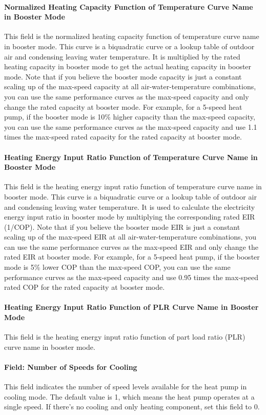 \paragraph{Normalized Heating Capacity Function of Temperature Curve Name in
Booster Mode} This field is the normalized heating capacity function of
temperature curve name in booster mode. This curve is a biquadratic curve or a
lookup table of outdoor air and condensing leaving water temperature. It is
multiplied by the rated heating capacity in booster mode to get the actual
heating capacity in booster mode. Note that if you believe the booster mode
capacity is just a constant scaling up of the max-speed capacity at all
air-water-temperature combinations, you can use the same performance curves as
the max-speed capacity and only change the rated capacity at booster mode.
For example, for a 5-speed heat pump, if the booster mode is 10\% higher capacity
than the max-speed capacity, you can use the same performance curves as the max-speed
capacity and use 1.1 times the max-speed rated capacity for the rated capacity at booster mode.
\paragraph{Heating Energy Input Ratio Function of Temperature Curve Name in
Booster Mode} This field is the heating energy input ratio function of
temperature curve name in booster mode. This curve is a biquadratic curve or a
lookup table of outdoor air and condensing leaving water temperature. It is used
to calculate the electricity energy input ratio in booster mode by multiplying
the corresponding rated EIR (1/COP). Note that if you believe the booster mode
EIR is just a constant scaling up of the max-speed EIR at all
air-water-temperature combinations, you can use the same performance curves as
the max-speed EIR and only change the rated EIR at booster mode.
For example, for a 5-speed heat pump, if the booster mode is 5\% lower COP
than the max-speed COP, you can use the same performance curves as the max-speed
capacity and use 0.95 times the max-speed rated COP for the rated capacity at booster mode.
\paragraph{Heating Energy Input Ratio Function of PLR Curve Name in Booster
Mode} This field is the heating energy input ratio function of part load ratio
(PLR) curve name in booster mode.
\paragraph{Field: Number of Speeds for Cooling} This field indicates the number
of speed levels available for the heat pump in cooling mode. The default value
is 1, which means the heat pump operates at a single speed. If there's no
cooling and only heating component, set this field to 0.
